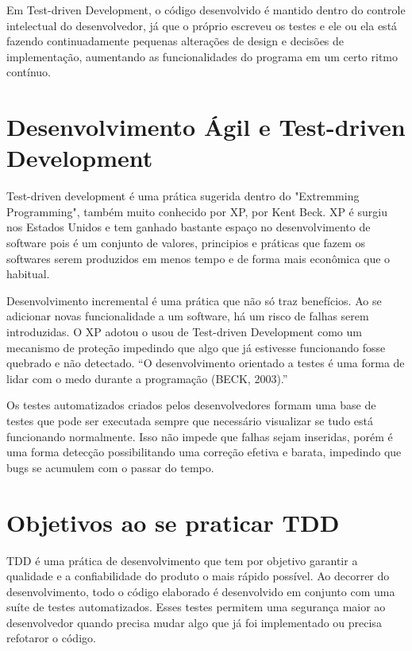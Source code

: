 \documentclass[12pt]{article}
\begin{document}
  Em Test-driven Development, o código desenvolvido é mantido dentro do controle
  intelectual do desenvolvedor, já que o próprio escreveu os testes e ele ou 
  ela está fazendo continuadamente pequenas alterações de design e decisões de 
  implementação, aumentando as funcionalidades do programa em um certo ritmo 
  contínuo.

  \section{Desenvolvimento Ágil e Test-driven Development}

  Test-driven development é uma prática sugerida dentro do "Extremming 
  Programming", também muito conhecido por XP, por Kent Beck. XP é surgiu nos
  Estados Unidos e tem ganhado bastante espaço no desenvolvimento de software
  pois é um conjunto de valores, principios e práticas que fazem os softwares 
  serem produzidos em menos tempo e de forma mais econômica que o habitual.

  Desenvolvimento incremental é uma prática que não só traz benefícios. Ao se
  adicionar novas funcionalidade a um software, há um risco de falhas serem 
  introduzidas. O XP adotou o usou de Test-driven Development como um mecanismo
  de proteção impedindo que algo que já estivesse funcionando fosse quebrado
  e não detectado. “O desenvolvimento orientado a testes é uma forma de lidar 
  com o medo durante a programação (BECK, 2003).”

  Os testes automatizados criados pelos desenvolvedores formam uma base de 
  testes que pode ser executada sempre que necessário visualizar se tudo está
  funcionando normalmente. Isso não impede que falhas sejam inseridas, porém
  é uma forma detecção possibilitando uma correção efetiva e barata, impedindo
  que bugs se acumulem com o passar do tempo.

  \section{Objetivos ao se praticar TDD}

  TDD é uma prática de desenvolvimento que tem por objetivo garantir a
  qualidade e a confiabilidade do produto o mais rápido possível. Ao decorrer do
  desenvolvimento, todo o código elaborado é desenvolvido em conjunto com uma
  suíte de testes automatizados. Esses testes permitem uma segurança maior ao
  desenvolvedor quando precisa mudar algo que já foi implementado ou precisa 
  refotaror o código.
\end{document}
